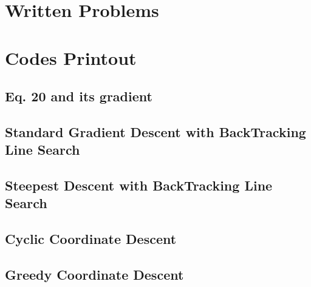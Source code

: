 \documentclass[11pt,a4paper]{article}
\begin{document}
\newpage
\section{Written Problems}


\newpage
\appendix
\section{Codes Printout}

\subsection{Eq. 20 and its gradient}



\newpage
\subsection{Standard Gradient Descent with BackTracking Line Search}

\newpage

\subsection{Steepest Descent with BackTracking Line Search}

\newpage

\subsection{Cyclic Coordinate Descent}

\newpage

\subsection{Greedy Coordinate Descent}

\newpage
\end{document}
